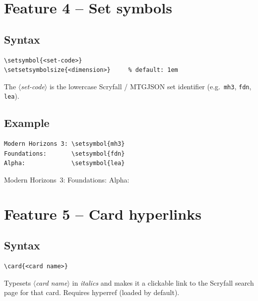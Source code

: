 \documentclass[a4paper,11pt]{article}
\newcommand{\pkg}[1]{\textsf{#1}}
\newcommand{\meta}[1]{\textnormal{\textit{$\langle$#1$\rangle$}}}
\begin{document}
\section{Feature 4 -- Set symbols}

\subsection{Syntax}

\begin{lstlisting}
\setsymbol{<set-code>}
\setsetsymbolsize{<dimension>}     % default: 1em
\end{lstlisting}

The \meta{set-code} is the lowercase Scryfall / MTGJSON set
identifier (e.g.\ \texttt{mh3}, \texttt{fdn}, \texttt{lea}).

\subsection{Example}

\begin{lstlisting}
Modern Horizons 3: \setsymbol{mh3}
Foundations:       \setsymbol{fdn}
Alpha:             \setsymbol{lea}
\end{lstlisting}
\begin{result}
Modern Horizons~3: \quad
Foundations: \quad
Alpha: 
\end{result}

\section{Feature 5 -- Card hyperlinks}

\subsection{Syntax}

\begin{lstlisting}
\card{<card name>}
\end{lstlisting}

Typesets \meta{card name} in \textit{italics} and makes it a
clickable link to the Scryfall search page for that card.
Requires \pkg{hyperref} (loaded by default).
\end{document}
